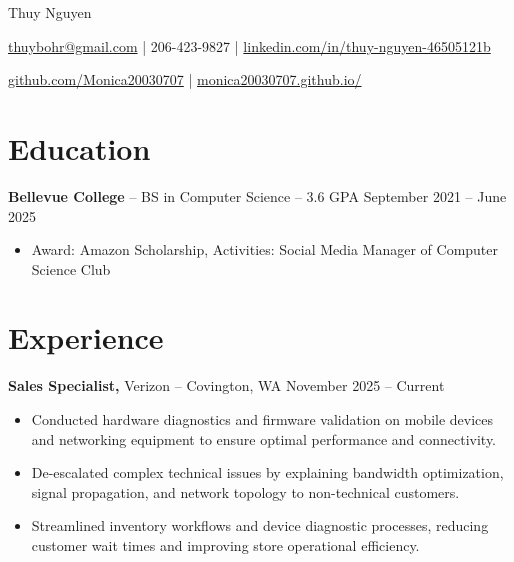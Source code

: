 \documentclass[11pt]{article}       %
\begin{document}
\centerline{\Huge Thuy Nguyen}

\vspace{5pt}

\centerline{\href{mailto:thuybohr@gmail.com}{thuybohr@gmail.com} | 206-423-9827 |
\href{https://www.linkedin.com/in/thuy-nguyen-46505121b/}{linkedin.com/in/thuy-nguyen-46505121b}}

\centerline{\href{https://github.com/Monica20030707}{github.com/Monica20030707} | 
\href{https://monica20030707.github.io/}{monica20030707.github.io/}} 

\vspace{-9pt}

\section*{Education}
\textbf{Bellevue College} -- BS in Computer Science -- 3.6 GPA \hfill September 2021 -- June 2025\\
\vspace{-9pt}
\begin{itemize}
  \item Award: Amazon Scholarship, Activities: Social Media Manager of Computer Science Club
\end{itemize}

\vspace{-18.5pt}

\section*{Experience}

\textbf{Sales Specialist,} {Verizon} -- Covington, WA \hfill November 2025 -- Current \\
\vspace{-9pt}
\begin{itemize}
  \item Conducted hardware diagnostics and firmware validation on mobile devices and networking equipment to ensure optimal performance and connectivity.
  \item De-escalated complex technical issues by explaining bandwidth optimization, signal propagation, and network topology to non-technical customers.
  \item Streamlined inventory workflows and device diagnostic processes, reducing customer wait times and improving store operational efficiency.
\end{itemize}
\end{document}
